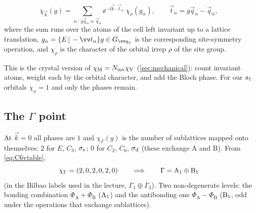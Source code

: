 \begin{keyresult}
\begin{equation}\label{eq:bandchar}
\chi_{\vec{k}}(g)=\sum_{\alpha\,:\,g\vec{q}_\alpha\equiv\vec{q}_\alpha}
\ee^{-\ii\vec{k}\cdot\vec{t}_\alpha}\;\chi_\rho(g_\alpha),
\qquad \vec{t}_\alpha=g\vec{q}_\alpha-\vec{q}_\alpha,
\end{equation}
where the sum runs over the atoms of the cell left invariant up to a lattice
translation, $g_\alpha=\seitz{E}{-\vec{t}_\alpha}g\in G_{\vec{q}_\alpha}$ is the
corresponding site-symmetry operation, and $\chi_\rho$ is the character of the orbital
irrep $\rho$ of the site group.
\end{keyresult}
This is the crystal version of $\chi_{\mathrm{M}}=N_{\mathrm{inv}}\chi_{\mathrm{V}}$ (\cref{sec:mechanical}): count invariant
atoms, weight each by the orbital character, and add the Bloch phase. For our
$\mathrm{a}_1$ orbitals $\chi_\rho=1$ and only the phases remain.

\subsection{The \texorpdfstring{$\Gamma$}{Gamma} point}
At $\vec{k}=0$ all phases are $1$ and $\chi_\Gamma(g)$ is the number of sublattices
mapped onto themselves: $2$ for $E$, $C_3$, $\sigma_{\mathrm{v}}$; $0$ for $C_2$, $C_6$, $\sigma_{\mathrm{d}}$ (these
exchange A and B). From \eqref{eq:C6vtable},
\[
\chi_\Gamma=(2,0,2,0,2,0)\qquad\Longrightarrow\qquad
\Gamma=\mathrm{A}_1\oplus\mathrm{B}_1
\]
(in the Bilbao labels used in the lecture, $\Gamma_1\oplus\Gamma_3$). Two
non-degenerate levels: the bonding combination $\Phi_{\mathrm{A}}+\Phi_{\mathrm{B}}$
($\mathrm{A}_1$) and the antibonding one $\Phi_{\mathrm{A}}-\Phi_{\mathrm{B}}$ ($\mathrm{B}_1$,
odd under the operations that exchange sublattices).

